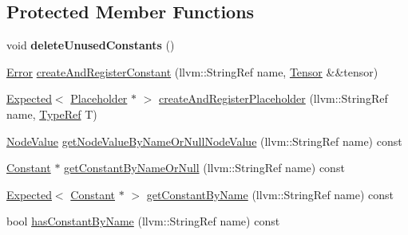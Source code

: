 \subsection*{Protected Member Functions}
\begin{DoxyCompactItemize}
\item 
\mbox{\label{classglow_1_1_protobuf_loader_a119e008b20c497b020e7bc706021d04d}} 
void {\bfseries delete\+Unused\+Constants} ()
\item 
\hyperlink{namespaceglow_afdb176c3a672ef66db0ecfc19a8d39bf}{Error} \hyperlink{classglow_1_1_protobuf_loader_ab6c3cd81547d30058fc6061e31353289}{create\+And\+Register\+Constant} (llvm\+::\+String\+Ref name, \hyperlink{classglow_1_1_tensor}{Tensor} \&\&tensor)
\item 
\hyperlink{classglow_1_1detail_1_1_glow_expected}{Expected}$<$ \hyperlink{classglow_1_1_placeholder}{Placeholder} $\ast$ $>$ \hyperlink{classglow_1_1_protobuf_loader_a423b742fbe850b05ee21e3dd06276fd2}{create\+And\+Register\+Placeholder} (llvm\+::\+String\+Ref name, \hyperlink{structglow_1_1_type}{Type\+Ref} T)
\item 
\hyperlink{structglow_1_1_node_value}{Node\+Value} \hyperlink{classglow_1_1_protobuf_loader_ac558da9000f7c4cf499e2b4862827e5c}{get\+Node\+Value\+By\+Name\+Or\+Null\+Node\+Value} (llvm\+::\+String\+Ref name) const
\item 
\hyperlink{classglow_1_1_constant}{Constant} $\ast$ \hyperlink{classglow_1_1_protobuf_loader_a85a86c2a07a5c396cc6a9fd25de6a2ae}{get\+Constant\+By\+Name\+Or\+Null} (llvm\+::\+String\+Ref name) const
\item 
\hyperlink{classglow_1_1detail_1_1_glow_expected}{Expected}$<$ \hyperlink{classglow_1_1_constant}{Constant} $\ast$ $>$ \hyperlink{classglow_1_1_protobuf_loader_a622b34ab4bbe4cfc5bcc5b03af58c214}{get\+Constant\+By\+Name} (llvm\+::\+String\+Ref name) const
\item 
bool \hyperlink{classglow_1_1_protobuf_loader_abcb6af3498f15a1d84bc8800dda2a8e2}{has\+Constant\+By\+Name} (llvm\+::\+String\+Ref name) const
\end{DoxyCompactItemize}
